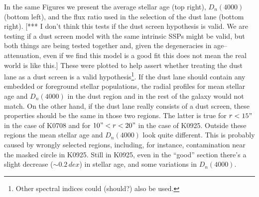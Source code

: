 \documentclass[a4paper]{article}
\begin{document}
In the same Figures we present the average stellar age (top right), $D_n(4000)$
(bottom left), and the flux ratio used in the selection of the dust lane (bottom
right). [*** I don't think this tests if the dust screen hypothesis is
valid. We are testing if a dust screen model with the same intrinsic
SSPs might be valid, but both things are being tested together and,
given the degeneracies in age--attenuation, even if we find this model
is a good fit this does not mean the real world is like this.]
These were plotted to help assert whether treating the dust lane as a
dust screen is a valid hypothesis\footnote{Other spectral indices could
(should?) also be used.}. If the dust lane should contain any embedded or
foreground stellar populations, the radial profiles for mean stellar age and
$D_n(4000)$ in the dust region and in the rest of the galaxy would not match. On
the other hand, if the dust lane really consists of a dust screen, these
properties should be the same in those two regions. The latter is true for $r <
15"$ in the case of K0708 and for $10" < r < 20"$ in the case of K0925. Outside
these regions the mean stellar age and $D_n(4000)$ look quite different. This is
probably caused by wrongly selected regions, including, for instance,
contamination near the masked circle in K0925. Still in K0925, even in the
``good'' section there's a slight decrease ($\sim 0.2\,dex$) in stellar age, and
some variations in $D_n(4000)$.

\end{document}
